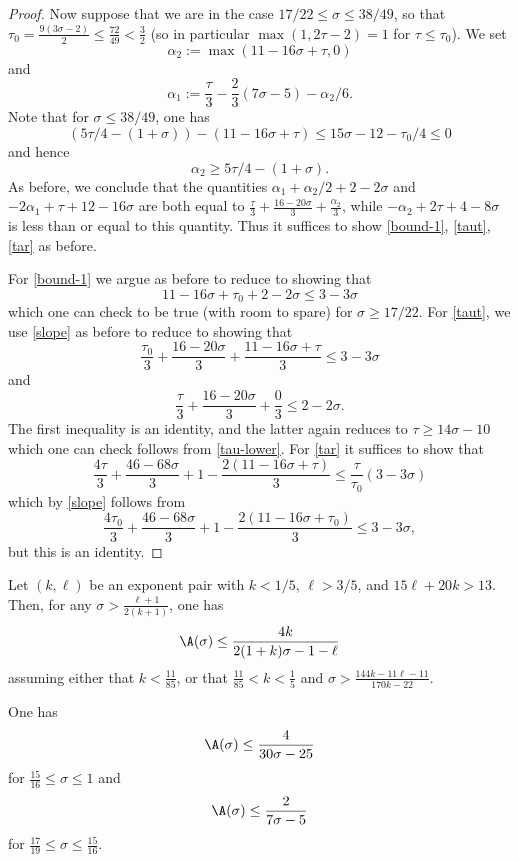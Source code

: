 \begin{proof}
Now suppose that we are in the case $17/22 \leq \sigma \leq 38/49$, so that $\tau_0 = \frac{9(3\sigma-2)}{2} \leq \frac{72}{49} < \frac{3}{2}$ (so in particular $\max(1,2\tau-2) = 1$ for $\tau \leq \tau_0$).  We set
$$ \alpha_2 := \max(11 - 16 \sigma + \tau,0)$$
and
$$ \alpha_1 := \frac{\tau}{3} - \frac{2}{3} (7\sigma-5) - \alpha_2/6.$$
Note that for $\sigma \leq 38/49$, one has
$$ (5\tau/4 - (1+\sigma)) - (11 - 16 \sigma + \tau) \leq 15\sigma - 12 - \tau_0/4 \leq 0$$
and hence
$$ \alpha_2 \geq 5\tau/4 - (1+\sigma).$$
As before, we conclude that the quantities $\alpha_1+\alpha_2/2 + 2-2\sigma$ and $-2\alpha_1 + \tau + 12 - 16 \sigma$ are both equal to $\frac{\tau}{3} + \frac{16-20\sigma}{3} + \frac{\alpha_2}{3}$, while $-\alpha_2 + 2\tau+4-8\sigma$ is less than or equal to this quantity.  Thus it suffices to show \eqref{bound-1}, \eqref{taut}, \eqref{tar} as before.

For \eqref{bound-1} we argue as before to reduce to showing that
$$ 11 - 16 \sigma + \tau_0 + 2 - 2 \sigma \leq 3 - 3\sigma$$
which one can check to be true (with room to spare) for $\sigma \geq 17/22$.  For \eqref{taut}, we use \eqref{slope} as before to reduce to showing that
$$ \frac{\tau_0}{3} + \frac{16-20\sigma}{3} + \frac{11 - 16 \sigma + \tau}{3} \leq 3 -3 \sigma$$
and
$$ \frac{\tau}{3} + \frac{16-20\sigma}{3} + \frac{0}{3} \leq 2 -2 \sigma.$$
The first inequality is an identity, and the latter again reduces to  $\tau \geq 14\sigma-10$ which one can check follows from \eqref{tau-lower}.  For \eqref{tar} it suffices to show that
$$ \frac{4\tau}{3} + \frac{46-68\sigma}{3}  + 1 - \frac{2(11 - 16 \sigma + \tau)}{3} \leq \frac{\tau}{\tau_0} (3-3\sigma)$$
which by \eqref{slope} follows from
$$ \frac{4\tau_0}{3} + \frac{46-68\sigma}{3}  + 1 - \frac{2(11 - 16 \sigma + \tau_0)}{3} \leq 3 - 3\sigma,$$
but this is an identity.
\end{proof}

\begin{theorem}\label{bourgain-zd}\cite[Proposition 3]{bourgain_remarks_1995}  Let $(k,\ell)$ be an exponent pair with $k < 1/5$, $\ell > 3/5$, and $15\ell + 20k > 13$.  Then, for any $\sigma > \frac{\ell+1}{2(k+1)}$, one has
    $$ \A(\sigma) \leq \frac{4k}{2(1+k)\sigma - 1 - \ell}$$
    assuming either that $k < \frac{11}{85}$, or that $\frac{11}{85} < k < \frac{1}{5}$ and $\sigma > \frac{144k-11\ell-11}{170k-22}$.
\end{theorem}

\begin{corollary}\label{bourgain-zero-density}\cite[Corollary 4]{bourgain_remarks_1995}  One has
    $$ \A(\sigma) \leq \frac{4}{30\sigma-25}$$
    for $\frac{15}{16} \leq \sigma \leq 1$
    and
    $$ \A(\sigma) \leq \frac{2}{7\sigma-5}$$
    for $\frac{17}{19} \leq \sigma \leq \frac{15}{16}$.
\end{corollary}

